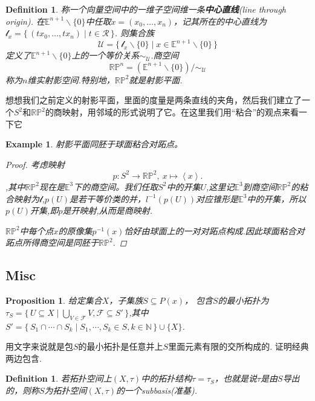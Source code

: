 \documentclass{article}
\newtheorem{proposition}[theorem]{Proposition}
\newtheorem{example}[theorem]{Example}
\newtheorem{definition}[theorem]{Definition}
\newcommand*{\xfunc}[4]{{#2}\colon{#3}{#1}{#4}}
\newcommand*{\func}[3]{\xfunc{\to}{#1}{#2}{#3}}
\newcommand\Set[2]{\{\,#1\mid#2\,\}} %
\begin{document}
\begin{definition}
称一个向量空间中的一维子空间维一条\textbf{中心直线}(line through origin). 在$\mathbb{E}^{n+1} \smallsetminus \{0\}$中任取$x=(x_0,\ldots,x_n)$，记其所在的中心直线为$\mathcal{l}_x=\Set{(tx_0,\ldots,tx_n)}{t \in \mathcal{R}}$. 则集合族\[\mathcal{U} = \Set{\mathcal{l}_x \smallsetminus \{0\} }{x \in \mathbb{E}^{n+1} \smallsetminus \{0\}}\]定义了$\mathbb{E}^{n+1} \smallsetminus \{0\}$上的一个等价关系$\sim_{\mathcal{U}}$.商空间\[\mathbb{R}\mathbb{P}^n=(\mathbb{E}^{n+1} \smallsetminus \{0\}) / \sim_{\mathcal{U}}\]称为$n$维实射影空间.特别地，$\mathbb{R}\mathbb{P}^2$就是射影平面.
\end{definition}

想想我们之前定义的射影平面，里面的度量是两条直线的夹角，然后我们建立了一个$S^2$和$\mathbb{R}\mathbb{P}^2$的商映射，用邻域的形式说明了它。在这里我们用“粘合”的观点来看一下它

\begin{example}
射影平面同胚于球面粘合对跖点。
\begin{proof}
考虑映射\[\func{p}{S^2}{\mathbb{R}\mathbb{P}^2},\ x \mapsto \left< x \right>.\],其中$\mathbb{R}\mathbb{P}^2$现在是$\mathbb{E}^3$下的商空间。我们任取$S^2$中的开集$U$,这里记$\mathbb{E}^3$到商空间$\mathbb{R}\mathbb{P}^2$的粘合映射为$\mathcal{l}$,$p(U)$是若干等价类的并，$l^{-1}(p(U))$对应锥形是$\mathbb{E}^3$中的开集，所以$p(U)$开集,即$p$是开映射,从而是商映射.

$\mathbb{R}\mathbb{P}^2$中每个点$x$的原像集$p^{-1}(x)$恰好由球面上的一对对跖点构成.因此球面粘合对跖点所得商空间是同胚于$\mathbb{R}\mathbb{P}^2$.
\end{proof}
\end{example}


\newpage
\subsection{Misc}

\begin{proposition}
给定集合$X$，子集族$S \subseteq P(x)$， 包含$S$的最小拓扑为$\tau_S = \Set{U \subseteq X}{\bigcup\limits_{V \in \mathcal{F}} V, \mathcal{F} \subseteq S'}$,其中$S' = \Set{S_1 \cap \cdots \cap S_k}{S_1,\cdots,S_k \in S, k \in \mathbb{N}} \cup \{X\}$.
\end{proposition}

用文字来说就是包$S$的最小拓扑是任意并上$S$里面元素有限的交所构成的. 证明经典两边包含.

\begin{definition}
若拓扑空间上$(X,\tau)$中的拓扑结构$\tau = \tau_S$，也就是说$\tau$是由$S$导出的，则称$S$为拓扑空间$(X,\tau)$的一个\rm subbasis(准基).
\end{definition}
\end{document}
